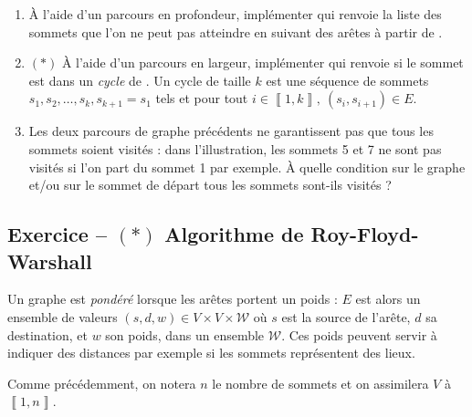 \documentclass{article}
\newcounter{loop}
\newcounter{numEx}
\newcommand{\exo}[1]{
	\stepcounter{numEx}
	\setcounter{loop}{0}
	\subsection*{Exercice \arabic{numEx} -- #1}
}
\newcommand{\llbra}{\left\llbracket}
\newcommand{\rrbra}{\right\rrbracket}
\renewcommand{\brack}[1]{\ensuremath{\llbra#1\rrbra}}
\newcommand{\paren}[1]{\ensuremath{\left(#1\right)}}
\newcommand{\matr}[2]{\mathcal{M}_{#1}\paren{#2}}
\begin{document}
\begin{enumerate}[resume]
	\item À l'aide d'un parcours en profondeur, implémenter  qui renvoie la liste des sommets que l'on ne peut pas atteindre en suivant des arêtes à partir de .
	
	\item $(*)$ À l'aide d'un parcours en largeur, implémenter  qui renvoie  si le sommet  est dans un \emph{cycle} de . Un cycle de taille $k$ est une séquence de sommets $s_1, s_2, \ldots, s_k, s_{k+1} = s_1$ tels et pour tout $i\in\brack{1,k},\ (s_i,s_{i+1})\in E$.

	\item Les deux parcours de graphe précédents ne garantissent pas que tous les sommets soient visités : dans l'illustration, les sommets 5 et 7 ne sont pas visités si l'on part du sommet 1 par exemple. À quelle condition sur le graphe et/ou sur le sommet de départ tous les sommets sont-ils visités ?

\end{enumerate}

%

\exo{$(*)$ Algorithme de Roy-Floyd-Warshall}

Un graphe est \emph{pondéré} lorsque les arêtes portent un poids : $E$ est alors un ensemble de valeurs $(s, d, w)\in V\times V\times\mathcal W$ où $s$ est la source de l'arête, $d$ sa destination, et $w$ son poids, dans un ensemble $\mathcal W$. Ces poids peuvent servir à indiquer des distances par exemple si les sommets représentent des lieux.

Comme précédemment, on notera $n$ le nombre de sommets et on assimilera $V$ à $\brack{1,n}$.
\end{document}
